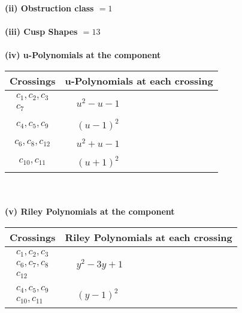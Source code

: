 \documentclass[1p]{elsarticle_modified}
\theoremstyle{definition}
\begin{document}
\flushleft \textbf{(ii) Obstruction class $= 1$}\\~\\
\flushleft \textbf{(iii) Cusp Shapes $= 13$}\\~\\
\newpage\renewcommand{\arraystretch}{1}
\flushleft \textbf{(iv) u-Polynomials at the component}\newline \\
\begin{tabular}{m{50pt}|m{274pt}}
Crossings & \hspace{64pt}u-Polynomials at each crossing \\
\hline $$\begin{aligned}c_{1},c_{2},c_{3}\\c_{7}\end{aligned}$$&$\begin{aligned}
&u^2- u-1
\end{aligned}$\\
\hline $$\begin{aligned}c_{4},c_{5},c_{9}\end{aligned}$$&$\begin{aligned}
&(u-1)^2
\end{aligned}$\\
\hline $$\begin{aligned}c_{6},c_{8},c_{12}\end{aligned}$$&$\begin{aligned}
&u^2+u-1
\end{aligned}$\\
\hline $$\begin{aligned}c_{10},c_{11}\end{aligned}$$&$\begin{aligned}
&(u+1)^2
\end{aligned}$\\
\hline
\end{tabular}\\~\\
\newpage\renewcommand{\arraystretch}{1}
\flushleft \textbf{(v) Riley Polynomials at the component}\newline \\
\begin{tabular}{m{50pt}|m{274pt}}
Crossings & \hspace{64pt}Riley Polynomials at each crossing \\
\hline $$\begin{aligned}c_{1},c_{2},c_{3}\\c_{6},c_{7},c_{8}\\c_{12}\end{aligned}$$&$\begin{aligned}
&y^2-3 y+1
\end{aligned}$\\
\hline $$\begin{aligned}c_{4},c_{5},c_{9}\\c_{10},c_{11}\end{aligned}$$&$\begin{aligned}
&(y-1)^2
\end{aligned}$\\
\hline
\end{tabular}\\~\\
\end{document}

